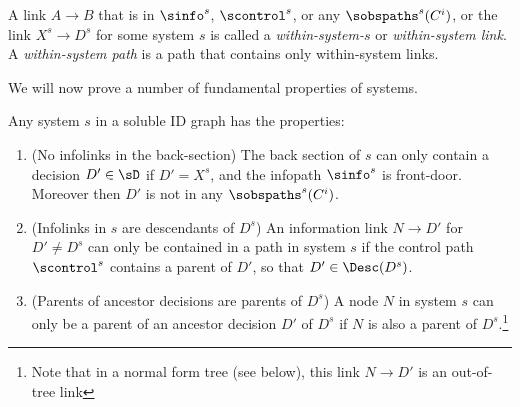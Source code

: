 \begin{definition} \label{sep12.4-within-system-within-tree-links}
A link $A\to B$ that is in $\sinfo^s$, $\scontrol^s$, or any $\sobspaths^s(C^i)$, or the link $X^s\to D^s$ for some system $s$ is called a \emph{within-system-$s$} or \emph{within-system link}. A \emph{within-system path} is a path that contains only within-system links.
\end{definition}

We will now prove a number of fundamental properties of systems.


\begin{lemma} \label{le:20Nov7.1-Basic-properties-of-systems-with-sufficient-recall}
Any system $s$ in a soluble ID graph has the properties: 
\begin{enumerate}[label=(\alph*)]
    \item (No infolinks in the back-section) \label{le:20Nov7.1a-no-decisions-in-the-back-section} 
    The back section of $s$ can only contain a decision $D' \in \sD$ if $D'=X^s$, and the infopath $\sinfo^s$ is front-door. Moreover then $D'$ is not in any $\sobspaths^s(C^i)$.
    
    \item (Infolinks in $s$ are descendants of $D^s$) \label{le:20Nov7.1b-info-path-decisions-observe-the-control-path}
    An information link $N \to D'$ for $D'\neq D^s$ can only be contained in a path in system $s$ if the control path $\scontrol^s$ contains a parent of $D'$, so that $D' \in \Desc(D^s)$.
    
    \item (Parents of ancestor decisions are parents of $D^s$) \label{le:20Nov7.1c-parents-of-ancestors-are-parents}
    A node $N$ in system $s$ can only be a parent of an ancestor decision $D'$ of $D^s$ if $N$ is also a parent of $D^s$.\footnote{Note that in a normal form tree (see below), this link $N \to D'$ is an out-of-tree link}
\end{enumerate}
\end{lemma}



